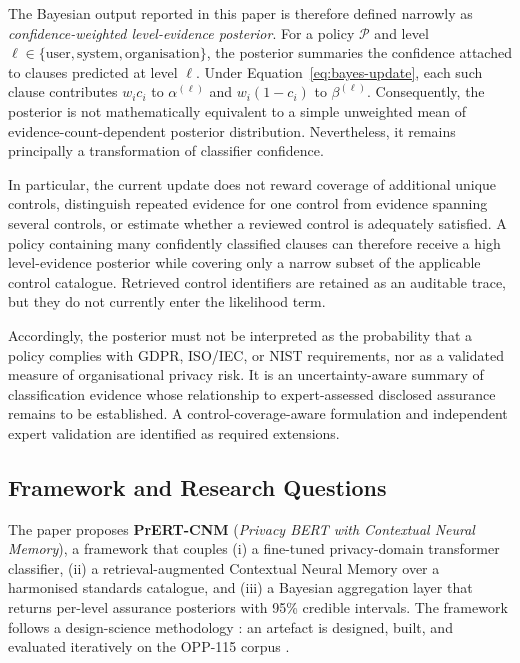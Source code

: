 \documentclass[final,3p,times,twocolumn]{elsarticle}
\begin{document}
The Bayesian output reported in this paper is therefore defined narrowly as \emph{confidence-weighted level-evidence posterior}. For a policy $\mathcal{P}$ and level $\ell\in\{\text{user},\text{system},\text{organisation}\}$, the posterior summaries the confidence attached to clauses predicted at level $\ell$. Under Equation~\ref{eq:bayes-update}, each such clause contributes $w_i c_i$ to $\alpha^{(\ell)}$ and $w_i(1-c_i)$ to $\beta^{(\ell)}$. Consequently, the posterior is not mathematically equivalent to a simple unweighted mean of evidence-count-dependent posterior distribution. Nevertheless, it remains principally a transformation of classifier confidence.

In particular, the current update does not reward coverage of additional unique controls, distinguish repeated evidence for one control from evidence spanning several controls, or estimate whether a reviewed control is adequately satisfied. A policy containing many confidently classified clauses can therefore receive a high level-evidence posterior while covering only a narrow subset of the applicable control catalogue. Retrieved control identifiers are retained as an auditable trace, but they do not currently enter the likelihood term.

Accordingly, the posterior must not be interpreted as the probability that a policy complies with GDPR, ISO/IEC, or NIST requirements, nor as a validated measure of organisational privacy risk. It is an uncertainty-aware summary of classification evidence whose relationship to expert-assessed disclosed assurance remains to be established. A control-coverage-aware formulation and independent expert validation are identified as required extensions.
    

	\subsection{Framework and Research Questions}
	The paper proposes \textbf{PrERT-CNM} (\emph{Privacy BERT with Contextual Neural Memory}), a framework that couples (i) a fine-tuned privacy-domain transformer classifier, (ii) a retrieval-augmented Contextual Neural Memory over a harmonised standards catalogue, and (iii) a Bayesian aggregation layer that returns per-level assurance posteriors with 95\% credible intervals. The framework follows a design-science methodology \citep{hevner2004design}: an artefact is designed, built, and evaluated iteratively on the OPP-115 corpus \citep{wilson2016opp115,opp115_dataset}.
\end{document}

